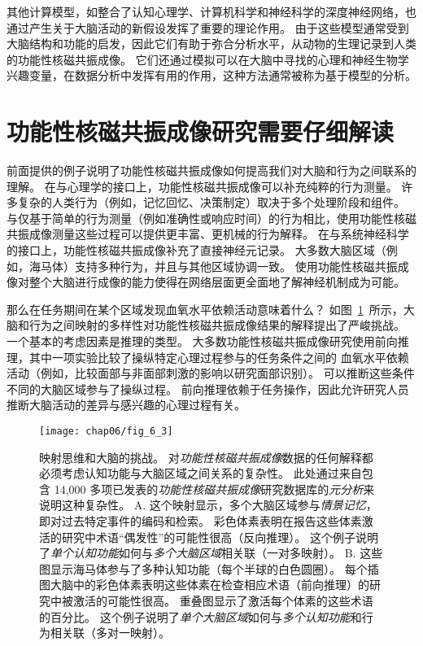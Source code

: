 其他计算模型，如整合了认知心理学、计算机科学和神经科学的深度神经网络，也通过产生关于大脑活动的新假设发挥了重要的理论作用。
由于这些模型通常受到大脑结构和功能的启发，因此它们有助于弥合分析水平，从动物的生理记录到人类的功能性核磁共振成像。 
它们还通过模拟可以在大脑中寻找的心理和神经生物学兴趣变量，在数据分析中发挥有用的作用，这种方法通常被称为基于模型的分析。



\section{功能性核磁共振成像研究需要仔细解读}

前面提供的例子说明了功能性核磁共振成像如何提高我们对大脑和行为之间联系的理解。 
在与心理学的接口上，功能性核磁共振成像可以补充纯粹的行为测量。
许多复杂的人类行为（例如，记忆回忆、决策制定）取决于多个处理阶段和组件。
与仅基于简单的行为测量（例如准确性或响应时间）的行为相比，使用功能性核磁共振成像测量这些过程可以提供更丰富、更机械的行为解释。
在与系统神经科学的接口上，功能性核磁共振成像补充了直接神经元记录。
大多数大脑区域（例如，海马体）支持多种行为，并且与其他区域协调一致。
使用功能性核磁共振成像对整个大脑进行成像的能力使得在网络层面更全面地了解神经机制成为可能。


那么在任务期间在某个区域发现血氧水平依赖活动意味着什么？
如图~\ref{fig:6_3}~所示，大脑和行为之间映射的多样性对功能性核磁共振成像结果的解释提出了严峻挑战。
一个基本的考虑因素是推理的类型。 
大多数功能性核磁共振成像研究使用前向推理，其中一项实验比较了操纵特定心理过程参与的任务条件之间的 血氧水平依赖活动（例如，比较面部与非面部刺激的影响以研究面部识别）。
可以推断这些条件不同的大脑区域参与了操纵过程。
前向推理依赖于任务操作，因此允许研究人员推断大脑活动的差异与感兴趣的心理过程有关。


\begin{figure}[htbp]
	\centering
	\texttt{[image: chap06/fig\_6\_3]}
	\caption{映射思维和大脑的挑战。
		对\textit{功能性核磁共振成像}数据的任何解释都必须考虑认知功能与大脑区域之间关系的复杂性。
		此处通过来自包含 14,000 多项已发表的\textit{功能性核磁共振成像}研究数据库的\textit{元分析}来说明这种复杂性。
		A. 这个映射显示，多个大脑区域参与\textit{情景记忆}，即对过去特定事件的编码和检索。
		彩色体素表明在报告这些体素激活的研究中术语“偶发性”的可能性很高（反向推理）。
		这个例子说明了\textit{单个认知功能}如何与\textit{多个大脑区域}相关联（一对多映射）。
		B. 这些图显示海马体参与了多种认知功能（每个半球的白色圆圈）。 
		每个插图大脑中的彩色体素表明这些体素在检查相应术语（前向推理）的研究中被激活的可能性很高。
		重叠图显示了激活每个体素的这些术语的百分比。
		这个例子说明了\textit{单个大脑区域}如何与\textit{多个认知功能}和行为相关联（多对一映射）。}
	\label{fig:6_3}
\end{figure}


